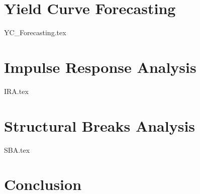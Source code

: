 \documentclass{vegaarticle}
\begin{document}
    \section{Yield Curve Forecasting}
        {YC_Forecasting.tex}
    
    \section{Impulse Response Analysis}
        {IRA.tex}

    \section{Structural Breaks Analysis}
        {SBA.tex}

    \section{Conclusion}
\end{document}
